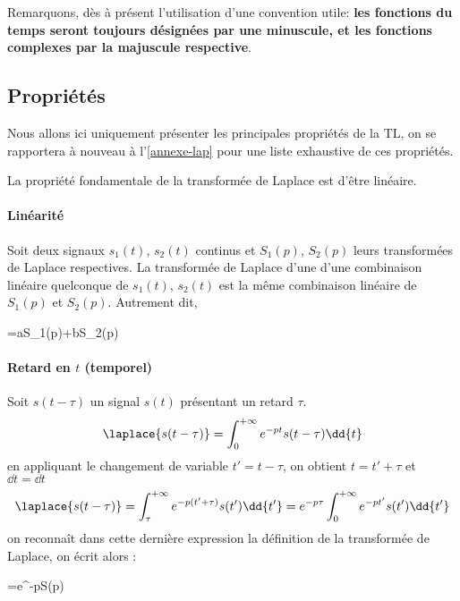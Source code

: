 Remarquons, dès à présent l'utilisation d'une convention utile: 
\textbf{les fonctions du temps seront toujours désignées par une
minuscule, et les fonctions complexes par la majuscule respective}.

\subsection{Propriétés}
Nous allons ici uniquement présenter les principales propriétés de la TL, 
on se rapportera à nouveau à l'\cref{annexe-lap} pour 
une liste exhaustive de ces propriétés.

La propriété fondamentale de la transformée de Laplace est d'être linéaire.
\paragraph{Linéarité}
Soit deux signaux $s_1(t)$, $s_2(t)$ continus et $S_1(p)$, $S_2(p)$ leurs
transformées de Laplace respectives. La transformée de Laplace d'une 
d'une combinaison linéaire quelconque de $s_1(t)$, $s_2(t)$ est la même combinaison linéaire 
de $S_1(p)$ et $S_2(p)$. Autrement dit,
\begin{bequation}
	=aS_1(p)+bS_2(p)
\end{bequation}

\paragraph{Retard en $t$ (temporel)}
Soit $s(t-\tau)$ un signal $s(t)$ présentant un retard $\tau$.
$$
\laplace{s(t-\tau)}=\int_{0}^{+\infty} e^{-pt}s(t-\tau)\dd{t}
$$
en appliquant le changement de variable $t'=t-\tau$, on obtient $t=t'+\tau$ 
et $\dd{t}=\dd{t}$
$$
\laplace{s(t-\tau)}
=\int_{\tau}^{+\infty} e^{-p(t'+\tau)}s(t')\dd{t'}
=e^{-p\tau}\int_{0}^{+\infty} e^{-pt'}s(t')\dd{t'}
$$
on reconnaît dans cette dernière expression la définition de la 
transformée de Laplace, on écrit alors :
\begin{bequation}
    =e^{-p\tau}S(p)
\end{bequation}
